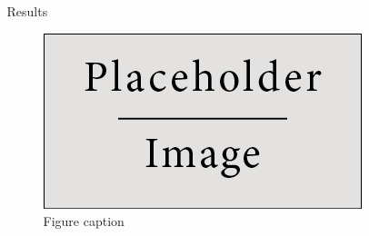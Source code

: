 \documentclass[final]{beamer}
\newlength{\onecolwid}
\newlength{\twocolwid}
\begin{document}
\begin{frame}[t]
\begin{columns}[t]
\begin{column}{\twocolwid}
\begin{columns}[t,totalwidth=\twocolwid]
\end{columns} %



\begin{columns}[t,totalwidth=\twocolwid] %

\begin{column}{\onecolwid} %





\end{column} %

\begin{column}{\onecolwid} %


\begin{block}{Results}

\begin{figure}
\includegraphics[width=0.8\linewidth]{placeholder.jpg}
\caption{Figure caption}
\end{figure}


\end{block}
\end{column}
\end{columns}
\end{column}
\end{columns}
\end{frame}
\end{document}
